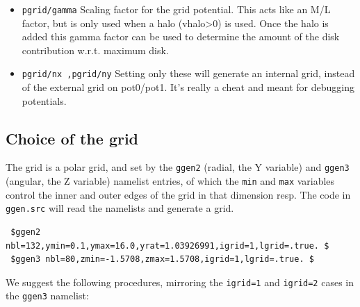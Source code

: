 \documentclass[10pt,dvips]{article}
\begin{document}
\begin{itemize}
\item
{\tt pgrid/gamma}
Scaling factor for the grid potential. This acts like an M/L factor,
but is only used when a halo (vhalo>0) is used.
Once the halo is added  this 
gamma factor can be used to determine the amount of the
disk contribution w.r.t. maximum disk.

\item
{\tt pgrid/nx ,pgrid/ny}
Setting only these will generate an internal grid, instead of the
external grid on pot0/pot1. It's really a cheat and meant for 
debugging potentials.


\end{itemize}


\subsection{Choice of the grid}

\bigskip

The grid is a polar grid, and set by the {\tt ggen2} (radial, the Y variable) 
and {\tt ggen3} (angular, the Z variable) namelist entries, 
of which the {\tt min} and {\tt max} variables control the 
inner and outer edges of the grid in that dimension resp. The code
in {\tt ggen.src} will read the namelists and generate a grid.

\begin{verbatim}
 $ggen2 nbl=132,ymin=0.1,ymax=16.0,yrat=1.03926991,igrid=1,lgrid=.true. $
 $ggen3 nbl=80,zmin=-1.5708,zmax=1.5708,igrid=1,lgrid=.true. $
\end{verbatim}


We suggest the following procedures, mirroring the {\tt igrid=1} and 
{\tt igrid=2} cases in the {\tt ggen3} namelist:
\end{document}

